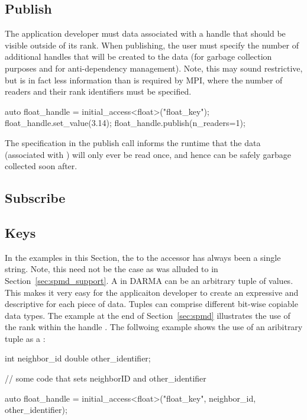 
\subsection{Publish}
\label{subsec:publish}
The application developer must data associated with a
handle that should be visible
outside of its \gls{rank}.  When publishing,  the user must specify the
number of additional handles that will be created to the data (for garbage
collection purposes and for \gls{anti-dependency} management).
Note, this may sound restrictive, but is in fact
less information than is required by \gls{MPI}, where the number of readers and
their \gls{rank} identifiers must be specified.

\begin{CppCode}
auto float_handle = initial_access<float>("float_key");
float_handle.set_value(3.14);
float_handle.publish(n_readers=1);
\end{CppCode}
The  specification in the publish call informs the
runtime that the data (associated with ) will
only ever be read once, and hence can be safely garbage collected soon after.


\subsection{Subscribe}
\label{subsec:subscribe}

\subsection{Keys}
\label{subsec:keys}
In the examples in this Section, the  to the accessor has always been a
single string.  Note, this need not be the case as was alluded to in
Section~\ref{sec:spmd_support}. A
 in DARMA 
can be an arbitrary \gls{tuple} of values.  This 
makes it very easy for the applicaiton developer to create an expressive
and descriptive  for each piece of data.  Tuples can comprise
different bit-wise copiable data types.  The example at the end of
Section~\ref{sec:spmd} illustrates the use of the \gls{rank} within the handle
.  The follwoing example shows the use of an
aribitrary \gls{tuple} as a :
\begin{CppCode}
  int neighbor_id
  double other_identifier;

  // some code that sets neighborID and other_identifier
  
  auto float_handle = initial_access<float>("float_key", 
                                            neighbor_id, 
                                            other_identifier);
\end{CppCode}


